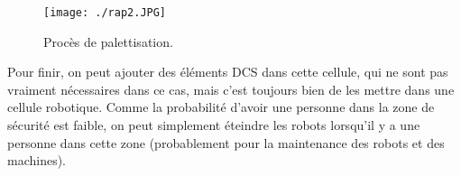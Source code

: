 \begin{figure}[H]
	\begin{center}	
		\texttt{[image: ./rap2.JPG]}
		\caption{Procès de palettisation.}
		\label{fig:rap2}
	\end{center}
\end{figure}

Pour finir, on peut ajouter des éléments DCS dans cette cellule, qui ne sont pas vraiment nécessaires dans ce cas, mais c’est toujours bien de les mettre dans une cellule robotique. Comme la probabilité d’avoir une personne dans la zone de sécurité est faible, on peut simplement éteindre les robots lorsqu’il y a une personne dans cette zone (probablement pour la maintenance des robots et des machines).






